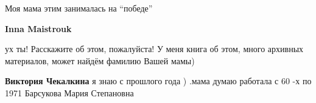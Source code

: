  
 
 
 
 

Моя мама этим занималась на \enquote{победе}

\textbf{Inna Maistrouk} 

ух ты! Расскажите об этом, пожалуйста! У меня книга об этом, много архивных
материалов, может найдём фамилию Вашей мамы)


\textbf{Виктория Чекалкина} я знаю с прошлого года ) .мама думаю работала с 60 -х по 1971 Барсукова Мария Степановна
